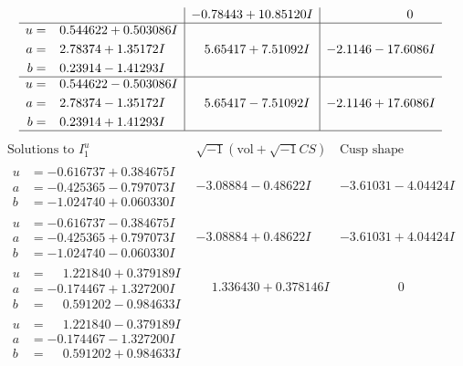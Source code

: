 \documentclass[1p]{elsarticle_modified}
\theoremstyle{definition}
\newcommand{\I}{\sqrt{-1}}
\begin{document}
$$\begin{array}{c|c|c}
 & -0.78443 + 10.85120 I & \phantom{-0.000000 } 0 \\ \hline\begin{aligned}
u &= \phantom{-}0.544622 + 0.503086 I \\
a &= \phantom{-}2.78374 + 1.35172 I \\
b &= \phantom{-}0.23914 - 1.41293 I\end{aligned}
 & \phantom{-}5.65417 + 7.51092 I & -2.1146 - 17.6086 I \\ \hline\begin{aligned}
u &= \phantom{-}0.544622 - 0.503086 I \\
a &= \phantom{-}2.78374 - 1.35172 I \\
b &= \phantom{-}0.23914 + 1.41293 I\end{aligned}
 & \phantom{-}5.65417 - 7.51092 I & -2.1146 + 17.6086 I\\
 \hline 
 \end{array}$$\newpage$$\begin{array}{c|c|c}  
\text{Solutions to }I^u_{1}& \I (\text{vol} + \sqrt{-1}CS) & \text{Cusp shape}\\
 \hline 
\begin{aligned}
u &= -0.616737 + 0.384675 I \\
a &= -0.425365 - 0.797073 I \\
b &= -1.024740 + 0.060330 I\end{aligned}
 & -3.08884 - 0.48622 I & -3.61031 - 4.04424 I \\ \hline\begin{aligned}
u &= -0.616737 - 0.384675 I \\
a &= -0.425365 + 0.797073 I \\
b &= -1.024740 - 0.060330 I\end{aligned}
 & -3.08884 + 0.48622 I & -3.61031 + 4.04424 I \\ \hline\begin{aligned}
u &= \phantom{-}1.221840 + 0.379189 I \\
a &= -0.174467 + 1.327200 I \\
b &= \phantom{-}0.591202 - 0.984633 I\end{aligned}
 & \phantom{-}1.336430 + 0.378146 I & \phantom{-0.000000 } 0 \\ \hline\begin{aligned}
u &= \phantom{-}1.221840 - 0.379189 I \\
a &= -0.174467 - 1.327200 I \\
b &= \phantom{-}0.591202 + 0.984633 I\end{aligned}

\end{array}$$
\end{document}
